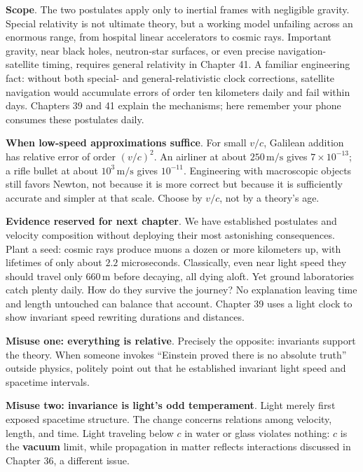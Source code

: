 
\textbf{Scope}. The two postulates apply only to inertial frames with negligible gravity. Special relativity is not ultimate theory, but a working model unfailing across an enormous range, from hospital linear accelerators to cosmic rays. Important gravity, near black holes, neutron-star surfaces, or even precise navigation-satellite timing, requires general relativity in Chapter 41. A familiar engineering fact: without both special- and general-relativistic clock corrections, satellite navigation would accumulate errors of order ten kilometers daily and fail within days. Chapters 39 and 41 explain the mechanisms; here remember your phone consumes these postulates daily.

\textbf{When low-speed approximations suffice}. For small \(v/c\), Galilean addition has relative error of order \((v/c)^{2}\). An airliner at about \(250\,\mathrm{m/s}\) gives \(7\times10^{-13}\); a rifle bullet at about \(10^{3}\,\mathrm{m/s}\) gives \(10^{-11}\). Engineering with macroscopic objects still favors Newton, not because it is more correct but because it is sufficiently accurate and simpler at that scale. Choose by \(v/c\), not by a theory's age.

\textbf{Evidence reserved for next chapter}. We have established postulates and velocity composition without deploying their most astonishing consequences. Plant a seed: cosmic rays produce muons a dozen or more kilometers up, with lifetimes of only about \(2.2\) microseconds. Classically, even near light speed they should travel only \(660\,\mathrm{m}\) before decaying, all dying aloft. Yet ground laboratories catch plenty daily. How do they survive the journey? No explanation leaving time and length untouched can balance that account. Chapter 39 uses a light clock to show invariant speed rewriting durations and distances.

\textbf{Misuse one: everything is relative}. Precisely the opposite: invariants support the theory. When someone invokes ``Einstein proved there is no absolute truth'' outside physics, politely point out that he established invariant light speed and spacetime intervals.

\textbf{Misuse two: invariance is light's odd temperament}. Light merely first exposed spacetime structure. The change concerns relations among velocity, length, and time. Light traveling below \(c\) in water or glass violates nothing: \(c\) is the \textbf{vacuum} limit, while propagation in matter reflects interactions discussed in Chapter 36, a different issue.

